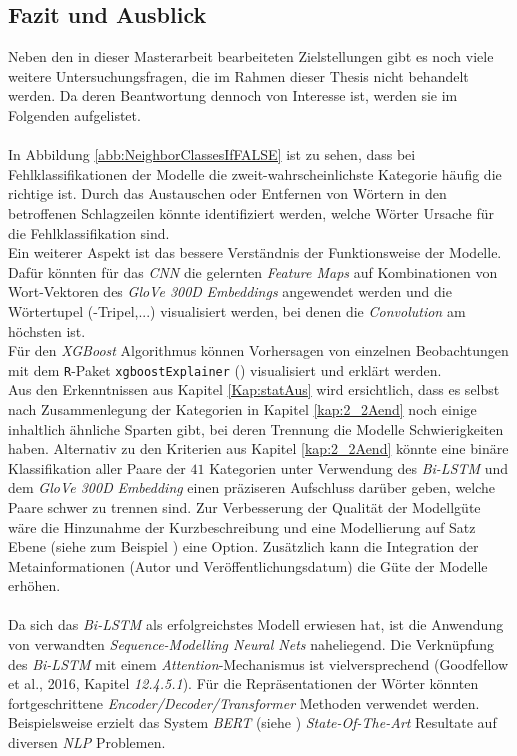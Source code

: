\documentclass[a4paper,11pt]{article}
\begin{document}
\subsection{Fazit und Ausblick}

Neben den in dieser Masterarbeit bearbeiteten Zielstellungen gibt es noch viele weitere Untersuchungsfragen, die im Rahmen dieser Thesis nicht behandelt werden. Da deren Beantwortung dennoch von Interesse ist, werden sie im Folgenden aufgelistet.\\
\\
In Abbildung \ref{abb:NeighborClassesIfFALSE} ist zu sehen, dass bei Fehlklassifikationen der Modelle die zweit-wahrscheinlichste Kategorie häufig die richtige ist. Durch das Austauschen oder Entfernen von Wörtern in den betroffenen Schlagzeilen könnte identifiziert werden, welche Wörter Ursache für die Fehlklassifikation sind.\\
Ein weiterer Aspekt ist das bessere Verständnis der Funktionsweise der Modelle. Dafür könnten für das \textit{CNN} die gelernten \textit{Feature Maps} auf Kombinationen von Wort-Vektoren des \textit{GloVe 300D} \textit{Embeddings} angewendet werden und die Wörtertupel (-Tripel,...) visualisiert werden, bei denen die \textit{Convolution} am höchsten ist.\\
Für den \textit{XGBoost} Algorithmus können Vorhersagen von einzelnen Beobachtungen mit dem \texttt{R}-Paket \texttt{xgboostExplainer} (\cite{xgBoostExplainer}) visualisiert und erklärt werden.\\
Aus den Erkenntnissen aus Kapitel \ref{Kap:statAus}
wird ersichtlich, dass es selbst nach Zusammenlegung der Kategorien in Kapitel \ref{kap:2_2Aend} noch einige inhaltlich ähnliche Sparten gibt, bei deren Trennung die Modelle Schwierigkeiten haben. Alternativ zu den Kriterien aus Kapitel \ref{kap:2_2Aend} könnte eine binäre Klassifikation aller Paare der $41$ Kategorien unter Verwendung des \textit{Bi-LSTM} und dem \textit{GloVe 300D} \textit{Embedding} einen präziseren Aufschluss darüber geben, welche Paare schwer zu trennen sind. Zur Verbesserung der Qualität der Modellgüte wäre die Hinzunahme der Kurzbeschreibung und eine Modellierung auf Satz Ebene (siehe zum Beispiel \cite{sentenceRep}) eine Option. Zusätzlich kann die Integration der Metainformationen (Autor und Veröffentlichungsdatum) die Güte der Modelle erhöhen. \\
\\
Da sich das \textit{Bi-LSTM} als erfolgreichstes Modell erwiesen hat, ist die Anwendung von verwandten \textit{Sequence-Modelling Neural Nets} naheliegend. Die Verknüpfung des \textit{Bi-LSTM} mit einem \textit{Attention}-Mechanismus ist  vielversprechend (Goodfellow et al., 2016, Kapitel \textit{12.4.5.1}). Für die Repräsentationen der Wörter könnten fortgeschrittene \textit{Encoder\-/Decoder/Transformer} Methoden verwendet werden. Beispielsweise erzielt das System \textit{BERT} (siehe \cite{bert}) \textit{State-Of-The-Art} Resultate auf diversen \textit{NLP} Problemen.\\
\end{document}
